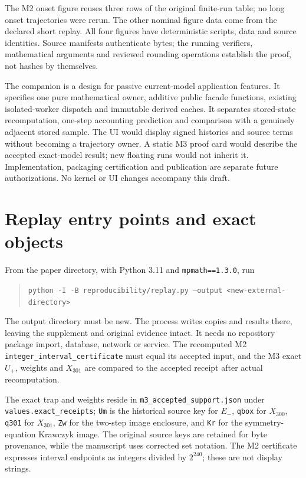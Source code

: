 \documentclass[11pt,a4paper]{article}
\begin{document}
The M2 onset figure reuses three rows of the original finite-run table; no long onset trajectories were rerun. The other nominal figure data come from the declared short replay. All four figures have deterministic scripts, data and source identities. Source manifests authenticate bytes; the running verifiers, mathematical arguments and reviewed rounding operations establish the proof, not hashes by themselves.

The companion  is a design for passive current-model application features. It specifies one pure mathematical owner, additive public facade functions, existing isolated-worker dispatch and immutable derived caches. It separates stored-state recomputation, one-step accounting prediction and comparison with a genuinely adjacent stored sample. The UI would display signed histories and source terms without becoming a trajectory owner. A static M3 proof card would describe the accepted exact-model result; new floating runs would not inherit it. Implementation, packaging certification and publication are separate future authorizations. No kernel or UI changes accompany this draft.

\appendix
\section{Replay entry points and exact objects}
From the paper directory, with Python 3.11 and \texttt{mpmath==1.3.0}, run
\begin{quote}\small
\texttt{python -I -B reproducibility/replay.py --output <new-external-directory>}
\end{quote}
The output directory must be new. The process writes copies and results there, leaving the supplement and original evidence intact. It needs no repository package import, database, network or service. The recomputed M2 \texttt{integer\_interval\_certificate} must equal its accepted input, and the M3 exact $U_+$, weights and $X_{301}$ are compared to the accepted receipt after actual recomputation.

The exact trap and weights reside in \texttt{m3\_accepted\_support.json} under \texttt{values.exact\_receipts}; \texttt{Um} is the historical source key for $E_-$, \texttt{qbox} for $X_{300}$, \texttt{q301} for $X_{301}$, \texttt{Zw} for the two-step image enclosure, and \texttt{Kr} for the symmetry-equation Krawczyk image. The original source keys are retained for byte provenance, while the manuscript uses corrected set notation. The M2 certificate expresses interval endpoints as integers divided by $2^{240}$; these are not display strings.
\end{document}
